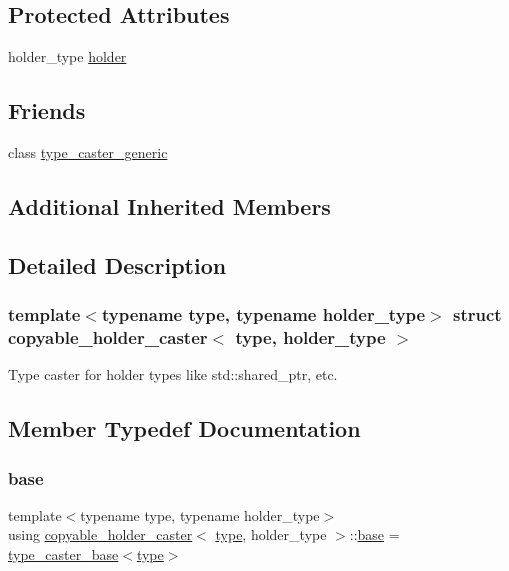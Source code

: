 \subsection*{Protected Attributes}
\begin{DoxyCompactItemize}
\item 
holder\+\_\+type \mbox{\hyperlink{structcopyable__holder__caster_a63b9604b16a2e9be8193d5cd0294c410}{holder}}
\end{DoxyCompactItemize}
\subsection*{Friends}
\begin{DoxyCompactItemize}
\item 
class \mbox{\hyperlink{structcopyable__holder__caster_a47dd585b718e81e33e44307daa659ba4}{type\+\_\+caster\+\_\+generic}}
\end{DoxyCompactItemize}
\subsection*{Additional Inherited Members}


\subsection{Detailed Description}
\subsubsection*{template$<$typename type, typename holder\+\_\+type$>$\newline
struct copyable\+\_\+holder\+\_\+caster$<$ type, holder\+\_\+type $>$}

Type caster for holder types like std\+::shared\+\_\+ptr, etc. 

\subsection{Member Typedef Documentation}
\mbox{\label{structcopyable__holder__caster_a5d25e9cc9ce588710bb255ddd1b904de}} 
\subsubsection{\texorpdfstring{base}{base}}
{\footnotesize\ttfamily template$<$typename type, typename holder\+\_\+type$>$ \\
using \mbox{\hyperlink{structcopyable__holder__caster}{copyable\+\_\+holder\+\_\+caster}}$<$ \mbox{\hyperlink{_s_d_l__opengl_8h_ad5ddf6fca7b585646515660e810e0188}{type}}, holder\+\_\+type $>$\+::\mbox{\hyperlink{structcopyable__holder__caster_a5d25e9cc9ce588710bb255ddd1b904de}{base}} =  \mbox{\hyperlink{classtype__caster__base}{type\+\_\+caster\+\_\+base}}$<$\mbox{\hyperlink{_s_d_l__opengl_8h_ad5ddf6fca7b585646515660e810e0188}{type}}$>$}



